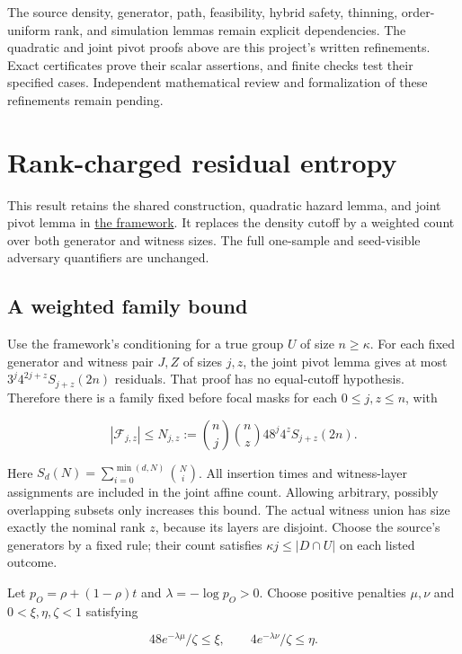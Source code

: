 \documentclass[11pt]{article}
\begin{document}
The source density, generator, path, feasibility, hybrid safety, thinning, order-uniform rank, and simulation lemmas remain explicit dependencies. The quadratic and joint pivot proofs above are this project's written refinements. Exact certificates prove their scalar assertions, and finite checks test their specified cases. Independent mathematical review and formalization of these refinements remain pending.

\section{Rank-charged residual entropy}\label{rank-charged-residual-entropy}

This result retains the shared construction, quadratic hazard lemma, and joint pivot lemma in \href{https://github.com/shea256/matroid-prophet-inequality/blob/master/paper/framework.md}{the framework}. It replaces the density cutoff by a weighted count over both generator and witness sizes. The full one-sample and seed-visible adversary quantifiers are unchanged.

\subsection{A weighted family bound}\label{a-weighted-family-bound}

Use the framework's conditioning for a true group \(U\) of size \(n\ge\kappa\). For each fixed generator and witness pair \(J,Z\) of sizes \(j,z\), the joint pivot lemma gives at most \(3^j4^{2j+z}S_{j+z}(2n)\) residuals. That proof has no equal-cutoff hypothesis. Therefore there is a family fixed before focal masks for each \(0\le j,z\le n\), with

\[|\mathcal F_{j,z}|\le N_{j,z}:=
\binom nj\binom nz48^j4^z S_{j+z}(2n).\]

Here \(S_d(N)=\sum_{i=0}^{\min(d,N)}\binom Ni\). All insertion times and witness-layer assignments are included in the joint affine count. Allowing arbitrary, possibly overlapping subsets only increases this bound. The actual witness union has size exactly the nominal rank \(z\), because its layers are disjoint. Choose the source's generators by a fixed rule; their count satisfies \(\kappa j\le|D\cap U|\) on each listed outcome.

Let \(p_O=\rho+(1-\rho)t\) and \(\lambda=-\log p_O>0\). Choose positive penalties \(\mu,\nu\) and \(0<\xi,\eta,\zeta<1\) satisfying

\[48e^{-\lambda\mu}/\zeta\le\xi,\qquad
4e^{-\lambda\nu}/\zeta\le\eta.\]
\end{document}
